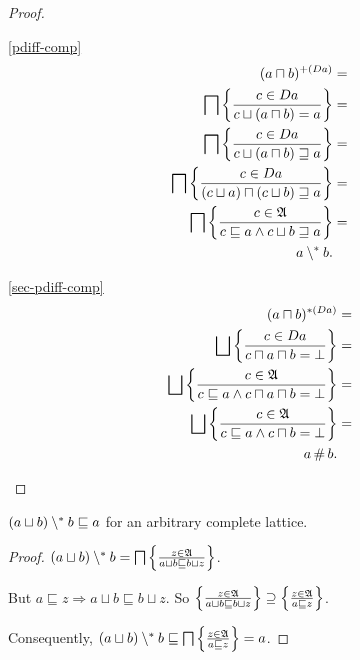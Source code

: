 \begin{proof}
~
\begin{disorder}
\item [{\ref{pdiff-comp}}] ~
\begin{align*}
(a\sqcap b)^{+(Da)} & =\\
\bigsqcap\left\{ \frac{c\in Da}{c\sqcup(a\sqcap b)=a}\right\} & =\\
\bigsqcap\left\{ \frac{c\in Da}{c\sqcup(a\sqcap b)\sqsupseteq a}\right\} & =\\
\bigsqcap\left\{ \frac{c\in Da}{(c\sqcup a)\sqcap(c\sqcup b)\sqsupseteq a}\right\} & =\\
\bigsqcap\left\{ \frac{c\in\mathfrak{A}}{c\sqsubseteq a\land c\sqcup b\sqsupseteq a}\right\} & =\\
a\setminus^{\ast} b.
\end{align*}

\item [{\ref{sec-pdiff-comp}}] ~
\begin{align*}
(a\sqcap b)^{\ast(Da)} & =\\
\bigsqcup\setcond{c\in Da}{c\sqcap a\sqcap b=\bot} & =\\
\bigsqcup\setcond{c\in\mathfrak{A}}{c\sqsubseteq a\land c\sqcap a\sqcap b=\bot} & =\\
\bigsqcup\setcond{c\in\mathfrak{A}}{c\sqsubseteq a\land c\sqcap b=\bot} & =\\
a\mathop\#b.
\end{align*}

\end{disorder}
\end{proof}
\begin{prop}
$(a\sqcup b)\setminus^{\ast} b\sqsubseteq a$ for an arbitrary complete
lattice.\end{prop}
\begin{proof}
$(a\sqcup b)\setminus^{\ast} b=\bigsqcap\left\{ \frac{z\in\mathfrak{A}}{a\sqcup b\sqsubseteq b\sqcup z}\right\}$.

But $a\sqsubseteq z\Rightarrow a\sqcup b\sqsubseteq b\sqcup z$. So
$\left\{ \frac{z\in\mathfrak{A}}{a\sqcup b\sqsubseteq b\sqcup z}\right\}\supseteq\left\{ \frac{z\in\mathfrak{A}}{a\sqsubseteq z}\right\}$.

Consequently, $(a\sqcup b)\setminus^{\ast} b\sqsubseteq\bigsqcap\left\{ \frac{z\in\mathfrak{A}}{a\sqsubseteq z}\right\}=a$.
\end{proof}

